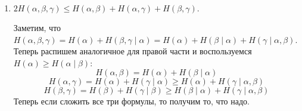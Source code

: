 \begin{prop}
\begin{enumerate}
\begin{proof*}
\begin{align*}
		            \right) \\
		            &= \sum_{j} p_{j} H(\alpha \mid \beta = j) \\
		            &= H(\alpha \mid \beta)
		        \end{align*}
		    \end{proof*}
		\item 
			$ 2H( \alpha , \beta , \gamma ) \le H( \alpha , \beta ) + H( \alpha,  \gamma ) + H( \beta , \gamma ).$
		\begin{proof*}
		 Заметим, что $H(\alpha, \beta, \gamma) = H(\alpha) + H(\beta, \gamma \mid \alpha) = H(\alpha) + H(\beta \mid \alpha) + H(\gamma \mid \alpha, \beta)$.\\
		 Теперь распишем аналогичное для правой части и воспользуемся $H(\alpha) \ge H(\alpha \mid \beta)$:
		 \[
		    H(\alpha, \beta) = H(\alpha) + H(\beta \mid \alpha)
		 \]
		 \[
		    H(\alpha, \gamma) = H(\alpha) + H(\gamma \mid \alpha) \ge H(\alpha) + H(\gamma \mid \alpha, \beta)
		 \]
		 \[
		    H(\beta, \gamma) = H(\beta) + H(\gamma \mid \beta) \ge H(\beta \mid \alpha) + H(\gamma \mid \alpha, \beta)
		 \]
		 Теперь если сложить все три формулы, то получим то, что надо.
		\end{proof*}
		
    \end{enumerate} 
\end{prop}

